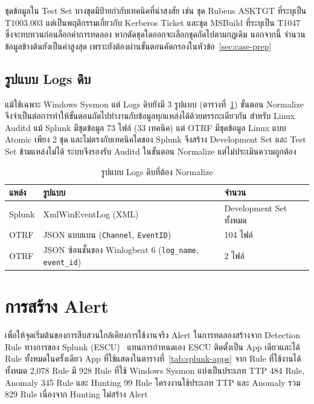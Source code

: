 ชุดข้อมูลใน Test Set บางชุดมีป้ายกำกับเทคนิคที่น่าสงสัย เช่น ชุด Rubeus ASKTGT ที่ระบุเป็น T1003.003
แต่เป็นพฤติกรรมเกี่ยวกับ Kerberos Ticket และชุด MSBuild ที่ระบุเป็น T1047
ซึ่งจะทบทวนก่อนล็อกค่าการทดลอง หากตัดชุดใดออกจะเลือกชุดถัดไปตามกฎเดิม
นอกจากนี้ จำนวนข้อมูลข้างต้นยังเป็นค่าสูงสุด เพราะยังต้องผ่านขั้นตอนคัดกรองในหัวข้อ~\ref{sec:case-prep}

\subsection{รูปแบบ Logs ดิบ}
แม้ใช้เฉพาะ Windows Sysmon แต่ Logs ดิบยังมี 3 รูปแบบ (ตารางที่~\ref{tab:raw-formats})
ขั้นตอน Normalize จึงจำเป็นต่อการทำให้ขั้นตอนถัดไปทำงานกับข้อมูลทุกแหล่งได้ด้วยตรรกะเดียวกัน
สำหรับ Linux Auditd แม้ Splunk มีชุดข้อมูล 73 ไฟล์ (33 เทคนิค) แต่ OTRF มีชุดข้อมูล Linux แบบ Atomic เพียง 2 ชุด
และไม่ตรงกับเทคนิคใดของ Splunk จึงสร้าง Development Set และ Test Set ข้ามแหล่งไม่ได้
ระบบจึงรองรับ Auditd ในขั้นตอน Normalize แต่ไม่ประเมินความถูกต้อง

\begin{table}[ht]
  \centering
  \caption{รูปแบบ Logs ดิบที่ต้อง Normalize}
  \label{tab:raw-formats}
  \small
  \begin{tabular}{|l|l|l|}
    \hline
    \textbf{แหล่ง} & \textbf{รูปแบบ} & \textbf{จำนวน} \\ \hline
    Splunk & XmlWinEventLog (XML) & Development Set ทั้งหมด \\ \hline
    OTRF & JSON แบบแบน (\texttt{Channel}, \texttt{EventID}) & 104 ไฟล์ \\ \hline
    OTRF & JSON ซ้อนชั้นของ Winlogbeat 6 (\texttt{log\_name}, \texttt{event\_id}) & 2 ไฟล์ \\ \hline
  \end{tabular}
\end{table}

\section{การสร้าง Alert}
\label{sec:alert}

เพื่อให้จุดเริ่มต้นของการสืบสวนใกล้เคียงการใช้งานจริง Alert ในการทดลองสร้างจาก Detection Rule ทางการของ Splunk (ESCU)~\cite{splunk-escu}
แทนการกำหนดเอง ESCU ติดตั้งเป็น App เดียวและได้ Rule ทั้งหมดในครั้งเดียว
App ที่ใช้แสดงในตารางที่~\ref{tab:splunk-apps}
จาก Rule ที่ใช้งานได้ทั้งหมด 2,078 Rule มี 928 Rule ที่ใช้ Windows Sysmon
แบ่งเป็นประเภท TTP 484 Rule, Anomaly 345 Rule และ Hunting 99 Rule
โครงงานใช้ประเภท TTP และ Anomaly รวม 829 Rule เนื่องจาก Hunting ไม่สร้าง Alert

